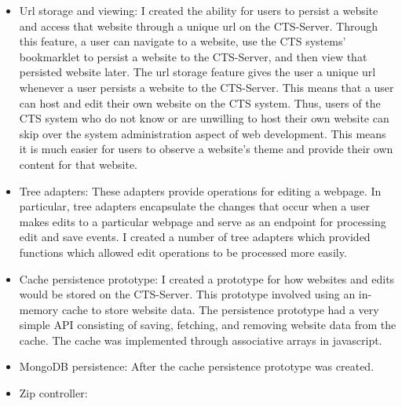 \documentclass[12pt]{article}
\begin{document}
\begin{itemize}
  \item Url storage and viewing: I created the ability for users to persist a website and access that website through a unique url on the CTS-Server. Through this feature, a user can navigate to a website, use the CTS systems' bookmarklet to persist a website to the CTS-Server, and then view that persisted website later. The url storage feature gives the user a unique url whenever a user persists a website to the CTS-Server. This means that a user can host and edit their own website on the CTS system. Thus, users of the CTS system who do not know or are unwilling to host their own website can skip over the system administration aspect of web development. This means it is much easier for users to observe a website's theme and provide their own content for that website.
  \item Tree adapters: These adapters provide operations for editing a webpage. In particular, tree adapters encapsulate the changes that occur when a user makes edits to a particular webpage and serve as an endpoint for processing edit and save events. I created a number of tree adapters which provided functions which allowed edit operations to be processed more easily.
  \item Cache persistence prototype: I created a prototype for how websites and edits would be stored on the CTS-Server. This prototype involved using an in-memory cache to store website data. The persistence prototype had a very simple API consisting of saving, fetching, and removing website data from the cache. The cache was implemented through associative arrays in javascript.
  \item MongoDB persistence: After the cache persistence prototype was created.
  \item Zip controller:
\end{itemize}
\end{document}

